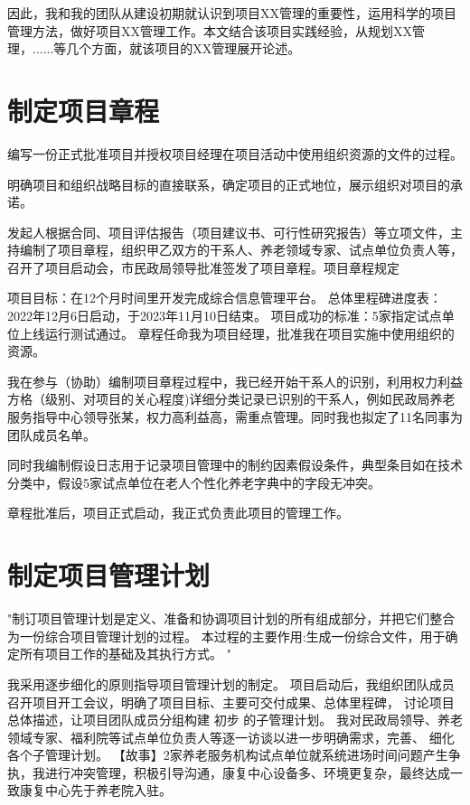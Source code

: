 \documentclass[UTF8]{../computerUniverse}
\begin{document}
因此，我和我的团队从建设初期就认识到项目XX管理的重要性，运用科学的项目管理方法，做好项目XX管理工作。本文结合该项目实践经验，从规划XX管理，......等几个方面，就该项目的XX管理展开论述。





\section{制定项目章程}

编写一份正式批准项目并授权项目经理在项目活动中使用组织资源的文件的过程。

明确项目和组织战略目标的直接联系，确定项目的正式地位，展示组织对项目的承诺。


发起人根据合同、项目评估报告（项目建议书、可行性研究报告）等立项文件，主持编制了项目章程，组织甲乙双方的干系人、养老领域专家、试点单位负责人等，召开了项目启动会，市民政局领导批准签发了项目章程。项目章程规定

项目目标：在12个月时间里开发完成综合信息管理平台。
总体里程碑进度表：2022年12月6日启动，于2023年11月10日结束。
项目成功的标准：5家指定试点单位上线运行测试通过。
章程任命我为项目经理，批准我在项目实施中使用组织的资源。


我在参与（协助）编制项目章程过程中，我已经开始干系人的识别，利用权力利益方格（级别、对项目的关心程度)详细分类记录已识别的干系人，例如民政局养老服务指导中心领导张某，权力高利益高，需重点管理。同时我也拟定了11名同事为团队成员名单。


同时我编制假设日志用于记录项目管理中的制约因素假设条件，典型条目如在技术分类中，假设5家试点单位在老人个性化养老字典中的字段无冲突。

章程批准后，项目正式启动，我正式负责此项目的管理工作。%



\section{制定项目管理计划}

"制订项目管理计划是定义、准备和协调项目计划的所有组成部分，并把它们整合为一份综合项目管理计划的过程。
本过程的主要作用:生成一份综合文件，用于确定所有项目工作的基础及其执行方式。
"



我采用逐步细化的原则指导项目管理计划的制定。
项目启动后，我组织团队成员召开项目开工会议，明确了项目目标、主要可交付成果、总体里程碑，
讨论项目总体描述，让项目团队成员分组构建 $初步$ 的子管理计划。
我对民政局领导、养老领域专家、福利院等试点单位负责人等逐一访谈以进一步明确需求，完善、 $细化$ 各个子管理计划。
【故事】2家养老服务机构试点单位就系统进场时间问题产生争执，我进行冲突管理，积极引导沟通，康复中心设备多、环境更复杂，最终达成一致康复中心先于养老院入驻。
\end{document}
